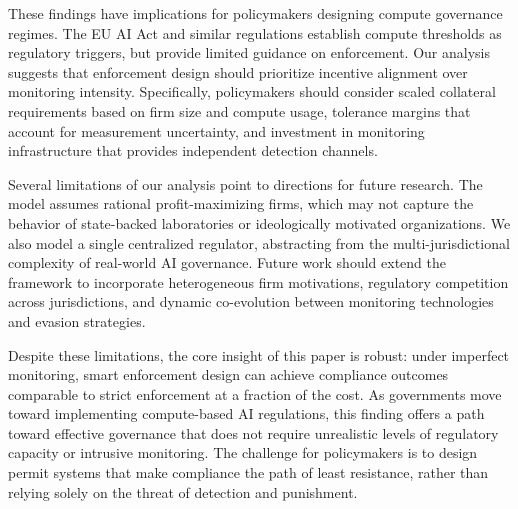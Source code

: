 These findings have implications for policymakers designing compute governance regimes. The EU AI Act and similar regulations establish compute thresholds as regulatory triggers, but provide limited guidance on enforcement. Our analysis suggests that enforcement design should prioritize incentive alignment over monitoring intensity. Specifically, policymakers should consider scaled collateral requirements based on firm size and compute usage, tolerance margins that account for measurement uncertainty, and investment in monitoring infrastructure that provides independent detection channels.

Several limitations of our analysis point to directions for future research. The model assumes rational profit-maximizing firms, which may not capture the behavior of state-backed laboratories or ideologically motivated organizations. We also model a single centralized regulator, abstracting from the multi-jurisdictional complexity of real-world AI governance. Future work should extend the framework to incorporate heterogeneous firm motivations, regulatory competition across jurisdictions, and dynamic co-evolution between monitoring technologies and evasion strategies.

Despite these limitations, the core insight of this paper is robust: under imperfect monitoring, smart enforcement design can achieve compliance outcomes comparable to strict enforcement at a fraction of the cost. As governments move toward implementing compute-based AI regulations, this finding offers a path toward effective governance that does not require unrealistic levels of regulatory capacity or intrusive monitoring. The challenge for policymakers is to design permit systems that make compliance the path of least resistance, rather than relying solely on the threat of detection and punishment.


